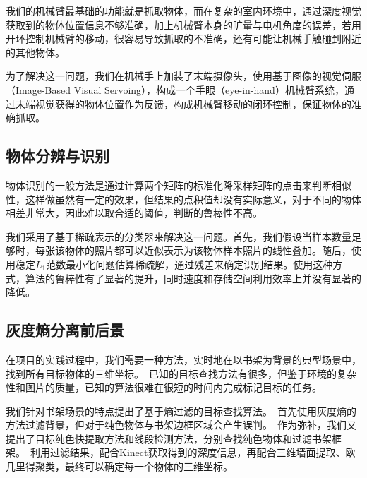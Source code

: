 我们的机械臂最基础的功能就是抓取物体，而在复杂的室内环境中，通过深度视觉获取到的物体位置信息不够准确，加上机械臂本身的旷量与电机角度的误差，若用开环控制机械臂的移动，很容易导致抓取的不准确，还有可能让机械手触碰到附近的其他物体。\ 

为了解决这一问题，我们在机械手上加装了末端摄像头，使用基于图像的视觉伺服（Image-Based Visual Servoing），构成一个手眼（eye-in-hand）机械臂系统，通过末端视觉获得的物体位置作为反馈，构成机械臂移动的闭环控制，保证物体的准确抓取。\ 

\subsection{物体分辨与识别}

物体识别的一般方法是通过计算两个矩阵的标准化降采样矩阵的点击来判断相似性\cite{aldoma2012point}，这样做虽然有一定的效果，但结果的点积值却没有实际意义，对于不同的物体相差非常大，因此难以取合适的阈值，判断的鲁棒性不高。\ 

我们采用了基于稀疏表示的分类器来解决这一问题。首先，我们假设当样本数量足够时，每张该物体的照片都可以近似表示为该物体样本照片的线性叠加。随后，使用稳定$L_1$范数最小化问题估算稀疏解，通过残差来确定识别结果。使用这种方式，算法的鲁棒性有了显著的提升，同时速度和存储空间利用效率上并没有显著的降低。\ 

\subsection{灰度熵分离前后景}

在项目的实践过程中，我们需要一种方法，实时地在以书架为背景的典型场景中，找到所有目标物体的三维坐标。\ 已知的目标查找方法有很多，但鉴于环境的复杂性和图片的质量，已知的算法很难在很短的时间内完成标记目标的任务。\ 

我们针对书架场景的特点提出了基于熵过滤的目标查找算法。\ 首先使用灰度熵的方法过滤背景，但对于纯色物体与书架边框区域会产生误判。\ 作为弥补，我们又提出了目标纯色快提取方法和线段检测方法，分别查找纯色物体和过滤书架框架。\ 利用过滤结果，配合Kinect获取得到的深度信息，再配合三维墙面提取、欧几里得聚类，最终可以确定每一个物体的三维坐标。\ 
